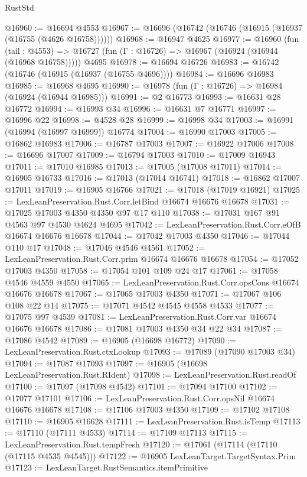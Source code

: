 \begin{lexlean}{RustStd}
\begin{coremodule}
@16960 := @16694 @4553
@16967 := @16696 (@16742 (@16746 (@16915 (@16937 (@16755 (@4626 @16758))))))
@16968 := @16947 @4625
@16977 := @16960
    (fun (tail : @4553) => @16727 (fun (Γ : @16726) => @16967 (@16924 (@16944 (@16968 @16758)))))
    @4695
@16978 := @16694 @16726
@16983 := @16742 (@16746 (@16915 (@16937 (@16755 @4696))))
@16984 := @16696 @16983
@16985 := @16968 @4695
@16990 := @16978 (fun (Γ : @16726) => @16984 (@16924 (@16944 @16985)))
@16991 := @2 @16773
@16993 := @16631 @28 @16772
@16994 := @16993 @34
@16996 := @16631 @7 @16771
@16997 := @16996 @22
@16998 := @4528 @28
@16999 := @16998 @34
@17003 := @16991 (@16994 (@16997 @16999)) @16774
@17004 := @16990 @17003
@17005 := @16862 @16983
@17006 := @16787 @17003
@17007 := @16922 @17006
@17008 := @16696 @17007
@17009 := @16794 @17003
@17010 := @17009 @16943
@17011 := @17010 @16985
@17013 := @17005 (@17008 @17011)
@17014 := @16905 @16733
@17016 := @17013 (@17014 @16741)
@17018 := @16862 @17007 @17011
@17019 := @16905 @16766
@17021 := @17018 (@17019 @16921)
@17025 := LexLeanPreservation.Rust.Corr.letBind @16674 @16676 @16678
@17031 := @17025 @17003 @4350 @4350 @97 @17 @110
@17038 := @17031 @167 @91 @4563 @97 @4530 @4624 @4695
@17042 := LexLeanPreservation.Rust.Corr.eOfB @16674 @16676 @16678
@17044 := @17042 @17003 @4350
@17046 := @17044 @110 @17
@17048 := @17046 @4546 @4561
@17052 := LexLeanPreservation.Rust.Corr.prim @16674 @16676 @16678
@17054 := @17052 @17003 @4350
@17058 := @17054 @101 @109 @24 @17
@17061 := @17058 @4546 @4559 @4550
@17065 := LexLeanPreservation.Rust.Corr.opsCons @16674 @16676 @16678
@17067 := @17065 @17003 @4350
@17071 := @17067 @106 @108 @22 @14
@17075 := @17071 @4542 @4545 @4558 @4533
@17077 := @17075 @97 @4539
@17081 := LexLeanPreservation.Rust.Corr.var @16674 @16676 @16678
@17086 := @17081 @17003 @4350 @34 @22 @34
@17087 := @17086 @4542
@17089 := @16905 (@16698 @16772)
@17090 := LexLeanPreservation.Rust.ctxLookup
@17093 := @17089 (@17090 @17003 @34)
@17094 := @17087 @17093
@17097 := @16905 (@16698 LexLeanPreservation.Rust.RIdent)
@17098 := LexLeanPreservation.Rust.readOf
@17100 := @17097 (@17098 @4542)
@17101 := @17094 @17100
@17102 := @17077 @17101
@17106 := LexLeanPreservation.Rust.Corr.opsNil @16674 @16676 @16678
@17108 := @17106 @17003 @4350
@17109 := @17102 @17108
@17110 := @16905 @16628
@17111 := LexLeanPreservation.Rust.isTemp
@17113 := @17110 (@17111 @4533)
@17114 := @17109 @17113
@17115 := LexLeanPreservation.Rust.tempFresh
@17120 := @17061 (@17114 (@17110 (@17115 @4535 @4545)))
@17122 := @16905 LexLeanTarget.TargetSyntax.Prim
@17123 := LexLeanTarget.RustSemantics.itemPrimitive

\end{coremodule}
\end{lexlean}
